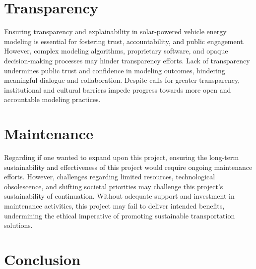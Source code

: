 \documentclass[10pt,twocolumn]{article}
\begin{document}
\section{Transparency}
Ensuring transparency and explainability in solar-powered vehicle energy modeling is essential for fostering trust, accountability, and public engagement. However, complex modeling algorithms, proprietary software, and opaque decision-making processes may hinder transparency efforts. Lack of transparency undermines public trust and confidence in modeling outcomes, hindering meaningful dialogue and collaboration. Despite calls for greater transparency, institutional and cultural barriers impede progress towards more open and accountable modeling practices.

\section{Maintenance}
Regarding if one wanted to expand upon this project, ensuring the long-term sustainability and effectiveness of this project would require ongoing maintenance efforts. However, challenges regarding limited resources, technological obsolescence, and shifting societal priorities may challenge this project's sustainability of continuation. Without adequate support and investment in maintenance activities, this project may fail to deliver intended benefits, undermining the ethical imperative of promoting sustainable transportation solutions.
\section{Conclusion}






\printbibliography
\end{document}
